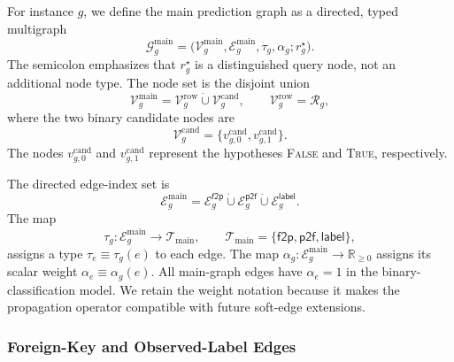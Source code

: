 \documentclass[11pt]{article}
\newcommand{\R}{\mathbb{R}}
\newcommand{\main}{\mathrm{main}}
\begin{document}
For instance \(g\), we define the main prediction graph as a directed,
typed multigraph
\begin{equation}
    \mathcal G_g^{\main}
    =
    \bigl(
        \mathcal V_g^{\main},
        \mathcal E_g^{\main},
        \tau_g,
        \alpha_g;
        r_g^\star
    \bigr).
    \label{eq:main-graph}
\end{equation}
The semicolon emphasizes that \(r_g^\star\) is a distinguished query node,
not an additional node type.  The node set is the disjoint union
\begin{equation}
    \mathcal V_g^{\main}
    =
    \mathcal V_g^{\mathrm{row}}
    \mathbin{\dot\cup}
    \mathcal V_g^{\mathrm{cand}},
    \qquad
    \mathcal V_g^{\mathrm{row}}=\mathcal R_g,
    \label{eq:main-node-set}
\end{equation}
where the two binary candidate nodes are
\begin{equation}
    \mathcal V_g^{\mathrm{cand}}
    =
    \bigl\{
        v_{g,0}^{\mathrm{cand}},
        v_{g,1}^{\mathrm{cand}}
    \bigr\}.
    \label{eq:binary-candidates}
\end{equation}
The nodes \(v_{g,0}^{\mathrm{cand}}\) and
\(v_{g,1}^{\mathrm{cand}}\) represent the hypotheses
\textsc{False} and \textsc{True}, respectively.

The directed edge-index set is
\begin{equation}
    \mathcal E_g^{\main}
    =
    \mathcal E_g^{\mathsf{f2p}}
    \mathbin{\dot\cup}
    \mathcal E_g^{\mathsf{p2f}}
    \mathbin{\dot\cup}
    \mathcal E_g^{\mathsf{label}}.
    \label{eq:main-edge-set}
\end{equation}
The map
\begin{equation}
    \tau_g:
    \mathcal E_g^{\main}
    \longrightarrow
    \mathcal T_{\main},
    \qquad
    \mathcal T_{\main}
    =
    \{\mathsf{f2p},\mathsf{p2f},\mathsf{label}\},
    \label{eq:main-edge-type-map}
\end{equation}
assigns a type \(\tau_e\equiv\tau_g(e)\) to each edge.  The map
\(\alpha_g:\mathcal E_g^{\main}\to\R_{\geq0}\) assigns its scalar weight
\(\alpha_e\equiv\alpha_g(e)\).  All main-graph edges have
\(\alpha_e=1\) in the binary-classification model.  We retain the weight
notation because it makes the propagation operator compatible with future
soft-edge extensions.

\subsubsection{Foreign-Key and Observed-Label Edges}
\label{sec:main-edges}
\end{document}
